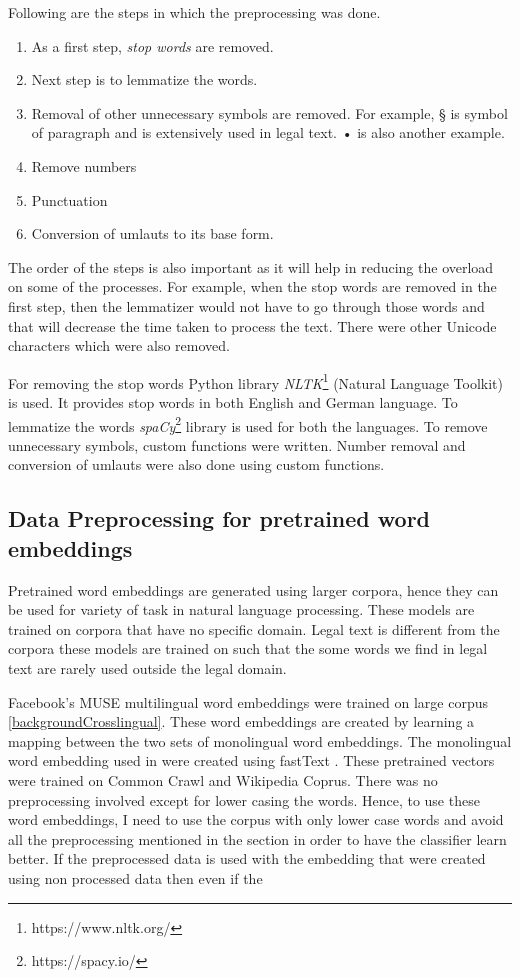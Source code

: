 Following are the steps in which the preprocessing was done.

\begin{enumerate}
    \item As a first step, \textit{stop words} are removed.
    \item Next step is to lemmatize the words.
    \item Removal of other unnecessary symbols are removed. For example, § is symbol of paragraph and is extensively used in legal text. • is also another example.
    \item Remove numbers
    \item Punctuation 
    \item Conversion of umlauts to its base form.
\end{enumerate}

The order of the steps is also important as it will help in reducing the overload on some of the processes. For example, when the stop words are removed in the first step, then the lemmatizer would not have to go through those words and that will decrease the time taken to process the text. There were other Unicode characters which were also removed.

For removing the stop words Python library \textit{NLTK}\footnote{https://www.nltk.org/} (Natural Language Toolkit) is used. It provides stop words in both English and German language. To lemmatize the words \textit{spaCy}\footnote{https://spacy.io/} library is used for both the languages. To remove unnecessary symbols, custom functions were written. Number removal and conversion of umlauts were also done using custom functions.

\iffalse


\subsection{Data Preprocessing for pretrained word embeddings}
Pretrained word embeddings are generated using larger corpora, hence they can be used for variety of task in natural language processing. These models are trained on corpora that have no specific domain. Legal text is different from the corpora these models are trained on such that the some words we find in legal text are rarely used outside the legal domain. 

Facebook's MUSE multilingual word embeddings \cite{conneau2017word} were trained on large corpus \ref{backgroundCrosslingual}. These word embeddings are created by learning a mapping between the two sets of monolingual word embeddings. The monolingual word embedding used in were created using fastText \cite{bojanowski2017enriching}. These pretrained vectors were trained on Common Crawl and Wikipedia Coprus. There was no preprocessing involved except for lower casing the words. Hence, to use these word embeddings, I need to use the corpus with only lower case words and avoid all the preprocessing mentioned in the section in order to have the classifier learn better. If the preprocessed data is used with the embedding that were created using non processed data then even if the 

